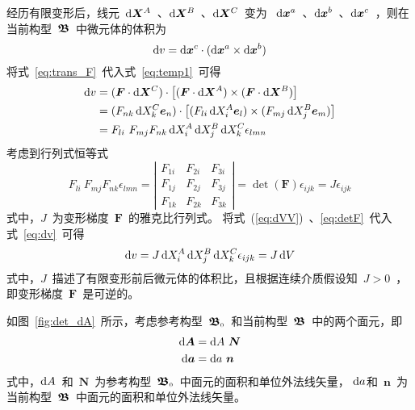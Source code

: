 经历有限变形后，线元~$\mathop{}\!\mathrm{d} \bm{X}^A$~、$\mathop{}\!\mathrm{d} \bm{X}^B$~、$\mathop{}\!\mathrm{d} \bm{X}^C$~变为
~$\mathop{}\!\mathrm{d} \bm{x}^a$~、$\mathop{}\!\mathrm{d} \bm{x}^b$~、$\mathop{}\!\mathrm{d} \bm{x}^c$~，则在当前构型~$\bm{\mathfrak{B}}$~中微元体的体积为
\begin{equation}\label{eq:temp1}
	\mathop{}\!\mathrm{d} v =\mathop{}\!\mathrm{d} \bm{x}^c \cdot (\mathop{}\!\mathrm{d} \bm{x}^a \times \mathop{}\!\mathrm{d} \bm{x}^b)
\end{equation}
将式~\eqref{eq:trans_F}~代入式~\eqref{eq:temp1}~可得
\begin{equation}\label{eq:dv}
	\begin{split}
	\diff v & =(\bm{F} \cdot \diff \bm{X}^C) \cdot \big[(\bm{F} \cdot \diff \bm{X}^A) \times (\bm{F} \cdot \diff \bm{X}^B)\big]\\
			& =(F_{nk} \diff X^C_k \bm{e}_n) \cdot \big[(F_{li} \diff X^A_i \bm{e}_l) \times (F_{mj} \diff X^B_j \bm{e}_m)\big]\\
			& =F_{li} ~ F_{mj} F_{nk} \diff X^A_i \diff X^B_j \diff X^C_k \epsilon_{lmn}
	\end{split}
\end{equation}
考虑到行列式恒等式\cite{detF}
\begin{equation}\label{eq:detF}
	F_{li} ~ F_{mj} F_{nk} \epsilon_{lmn} = 
	\left|\begin{array}{ccc}
	F_{1i} & F_{2i} & F_{3i} \\
	F_{1j} & F_{2j} & F_{3j} \\
	F_{1k} & F_{2k} & F_{3k}
	\end{array}\right|
	=\det (\bm{F}) \epsilon_{ijk} = J \epsilon_{ijk}
\end{equation}
式中，$J$~为变形梯度~$\bm{F}$~的雅克比行列式。
将式~(\ref{eq:dVV})~、\eqref{eq:detF}~代入式~\eqref{eq:dv}~可得
\begin{equation}\label{eq:J}
	\mathop{}\!\mathrm{d} v =J \mathop{}\!\mathrm{d} X^A_i \mathop{}\!\mathrm{d} X^B_j \mathop{}\!\mathrm{d} X^C_k \epsilon_{ijk} = J \mathop{}\!\mathrm{d} V
\end{equation}
式中，$J$~描述了有限变形前后微元体的体积比，且根据连续介质假设知~$J>0$~，即变形梯度~$\bm{F}$~是可逆的。

如图~\ref{fig:det_dA}~所示，考虑参考构型~$\bm{\mathfrak{B}}_{\scriptscriptstyle 0}$~和当前构型~$\bm{\mathfrak{B}}$~中的两个面元，即
\begin{subequations}\label{eq:dA}
	\begin{align}
	\mathop{}\!\mathrm{d} \bm{A} & =\mathop{}\!\mathrm{d} A ~\bm{N} \\
	\mathop{}\!\mathrm{d} \bm{a} & =\mathop{}\!\mathrm{d} a ~\bm{n}
	\end{align}
\end{subequations}
式中，$\mathop{}\!\mathrm{d} A$~和~$\bm{N}$~为参考构型~$\bm{\mathfrak{B}}_{\scriptscriptstyle 0}$~中面元的面积和单位外法线矢量，
$\mathop{}\!\mathrm{d} a$和~$\bm{n}$~为当前构型~$\bm{\mathfrak{B}}$~中面元的面积和单位外法线矢量。

